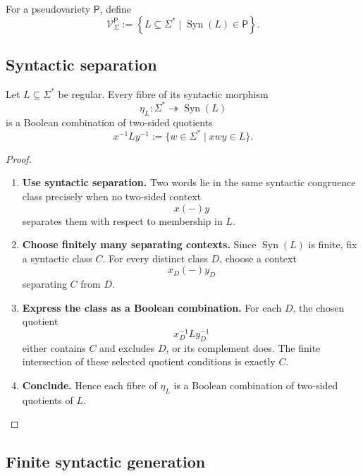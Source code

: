 For a pseudovariety \(\mathsf P\), define
\[
    \mathcal V^{\mathsf P}_\Sigma
    :=
    \left\{
        L\subseteq\Sigma^*
        \mid
        \operatorname{Syn}(L)\in\mathsf P
    \right\}.
\]

\subsection{Syntactic separation}
\label{subsec:to-syntactic-separation}

\begin{lemma}
\label{lem:to-syntactic-fibres}
    Let \(L\subseteq\Sigma^*\) be regular. Every fibre of its syntactic
    morphism
    \[
        \eta_L:
        \Sigma^*\twoheadrightarrow\operatorname{Syn}(L)
    \]
    is a Boolean combination of two-sided quotients
    \[
        x^{-1}Ly^{-1}
        :=
        \{w\in\Sigma^*\mid xwy\in L\}.
    \]
\end{lemma}

\begin{proof}
    \leavevmode
    \begin{enumerate}
        \item \textbf{Use syntactic separation.}
        Two words lie in the same syntactic congruence class precisely when no
        two-sided context
        \[
            x(-)y
        \]
        separates them with respect to membership in \(L\).

        \item \textbf{Choose finitely many separating contexts.}
        Since \(\operatorname{Syn}(L)\) is finite, fix a syntactic class
        \(C\). For every distinct class \(D\), choose a context
        \[
            x_D(-)y_D
        \]
        separating \(C\) from \(D\).

        \item \textbf{Express the class as a Boolean combination.}
        For each \(D\), the chosen quotient
        \[
            x_D^{-1}Ly_D^{-1}
        \]
        either contains \(C\) and excludes \(D\), or its complement does.
        The finite intersection of these selected quotient conditions is
        exactly \(C\).

        \item \textbf{Conclude.}
        Hence each fibre of \(\eta_L\) is a Boolean combination of two-sided
        quotients of \(L\).
    \end{enumerate}
\end{proof}

\subsection{Finite syntactic generation}
\label{subsec:to-finite-syntactic-generation}

